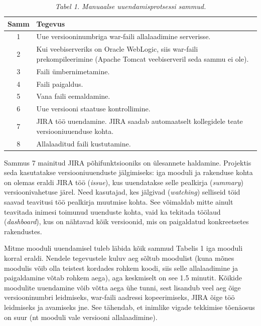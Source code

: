 \documentclass[12pt]{article}
\begin{document}
  \begin{table}[H]
    \caption*{\textit{Tabel 1. Manuaalse uuendamisprotsessi sammud.}}
  
    \begin{tabular}{ |c|p{11cm}| }
      \hline
      \textbf{Samm} & \textbf{Tegevus}\\
      \hline
      1 & Uue versiooninumbriga war\--faili allalaadimine serverisse.\\
      \hline
      2 & Kui veebiserveriks on Oracle WebLogic, siis war\--faili prekompileerimine (Apache Tomcat veebiserveril seda sammu ei ole).\\
      \hline
      3 & Faili ümbernimetamine.\\
      \hline
      4 & Faili paigaldus.\\
      \hline
      5 & Vana faili eemaldamine.\\
      \hline
      6 & Uue versiooni staatuse kontrollimine.\\
      \hline
      7 & JIRA\footnotemark{} töö uuendamine. JIRA saadab automaatselt kollegidele teate versiooniuuenduse kohta.\\
      \hline
      8 & Allalaaditud faili kustutamine.\\
      \hline
    \end{tabular}
  \end{table}
  
  
  Sammus 7 mainitud JIRA põhifunktsiooniks on ülesannete haldamine. Projektis seda kasutatakse versiooniuuenduste jälgimiseks: iga mooduli ja rakenduse kohta on olemas eraldi JIRA töö (\textit{issue}), kus uuendatakse selle pealkirja (\textit{summary}) versioonivahetuse järel. Need kasutajad, kes jälgivad (\textit{watching}) selliseid töid saavad teavitusi töö pealkirja muutmise kohta. See võimaldab mitte ainult teavitada inimesi toimunud uuenduste kohta, vaid ka tekitada töölaud (\textit{dashboard}), kus on nähtavad kõik versioonid, mis on paigaldatud konkreetsetes rakendustes.
  
  Mitme mooduli uuendamisel tuleb läbida kõik sammud Tabelis 1 iga mooduli korral eraldi. Nendele tegevustele kuluv aeg sõltub moodulist (kuna mõnes moodulis võib olla teistest kordades rohkem koodi, siis selle allalaadimine ja paigaldamine võtab rohkem aega), aga keskmiselt on see 1.5 minutit. Kõikide moodulite uuendamine võib võtta aega ühe tunni, sest lisandub veel aeg õige versiooninumbri leidmiseks, war\--faili aadressi kopeerimiseks, JIRA õige töö leidmiseks ja avamiseks jne. See tähendab, et inimlike vigade tekkimise tõenäosus on suur (nt mooduli vale versiooni allalaadimine).
  
\end{document}
